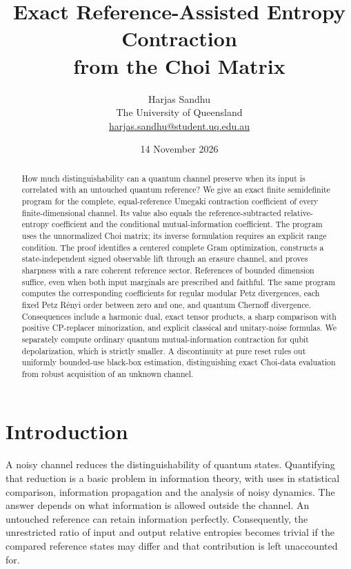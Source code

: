 \documentclass[11pt]{article}
\title{Exact Reference-Assisted Entropy Contraction\\from the Choi Matrix}
\author{Harjas Sandhu\\[3pt]\small The University of Queensland\\
\small\href{mailto:harjas.sandhu@student.uq.edu.au}{harjas.sandhu@student.uq.edu.au}}
\date{14 November 2026}
\numberwithin{equation}{section}
\theoremstyle{definition}
\theoremstyle{remark}
\begin{document}
\maketitle
\begin{abstract}
How much distinguishability can a quantum channel preserve when its input is
correlated with an untouched quantum reference? We give an exact finite
semidefinite program for the complete, equal-reference Umegaki contraction
coefficient of every finite-dimensional channel. Its value also equals the
reference-subtracted relative-entropy coefficient and the conditional
mutual-information coefficient. The program uses the unnormalized Choi matrix;
its inverse formulation requires an explicit range condition. The proof
identifies a centered complete Gram optimization, constructs a state-independent
signed observable lift through an erasure channel, and proves sharpness with a
rare coherent reference sector. References of bounded dimension suffice, even
when both input marginals are prescribed and faithful. The same program computes
the corresponding coefficients for regular modular Petz divergences, each fixed
Petz R\'enyi order between zero and one, and quantum Chernoff divergence.
Consequences include a harmonic dual, exact tensor products, a sharp comparison
with positive CP-replacer minorization, and explicit classical and unitary-noise
formulas. We separately compute ordinary quantum mutual-information contraction
for qubit depolarization, which is strictly smaller. A discontinuity at pure
reset rules out uniformly bounded-use black-box estimation, distinguishing exact
Choi-data evaluation from robust acquisition of an unknown channel.
\end{abstract}
\tableofcontents
\section{Introduction}
\label{sec:introduction}

A noisy channel reduces the distinguishability of quantum states. Quantifying
that reduction is a basic problem in information theory, with uses in statistical
comparison, information propagation and the analysis of noisy dynamics. The
answer depends on what information is allowed outside the channel. An untouched
reference can retain information perfectly. Consequently, the unrestricted
ratio of input and output relative entropies becomes trivial if the compared
reference states may differ and that contribution is left unaccounted for.
\end{document}
